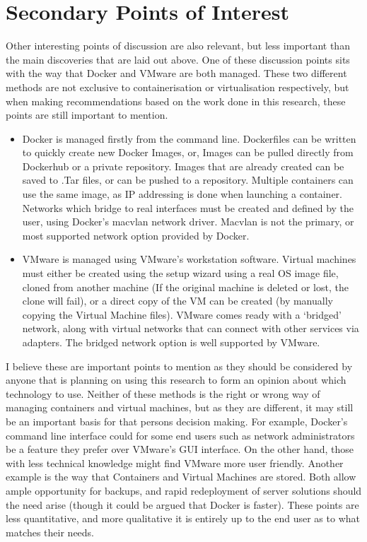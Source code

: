 \section{Secondary Points of Interest}
Other interesting points of discussion are also relevant, but less important than the main discoveries that are laid out above. One of these discussion points sits with the way that Docker and VMware are both managed. These two different methods are not exclusive to containerisation or virtualisation respectively, but when making recommendations based on the work done in this research, these points are still important to mention.
\begin{itemize}
  \item Docker is managed firstly from the command line. Dockerfiles can be written to quickly create new Docker Images, or, Images can be pulled directly from Dockerhub or a private repository. Images that are already created can be saved to .Tar files, or can be pushed to a repository. Multiple containers can use the same image, as IP addressing is done when launching a container. Networks which bridge to real interfaces must be created and defined by the user, using Docker's macvlan network driver. Macvlan is not the primary, or most supported network option provided by Docker.
  \item VMware is managed using VMware's workstation software. Virtual machines must either be created using the setup wizard using a real OS image file, cloned from another machine (If the original machine is deleted or lost, the clone will fail), or a direct copy of the VM can be created (by manually copying the Virtual Machine files). VMware comes ready with a `bridged' network, along with virtual networks that can connect with other services via adapters. The bridged network option is well supported by VMware.
\end{itemize}

I believe these are important points to mention as they should be considered by anyone that is planning on using this research to form an opinion about which technology to use. Neither of these methods is the right or wrong way of managing containers and virtual machines, but as they are different, it may still be an important basis for that persons decision making. For example, Docker's command line interface could for some end users such as network administrators be a feature they prefer over VMware's GUI interface. On the other hand, those with less technical knowledge might find VMware more user friendly. Another example is the way that Containers and Virtual Machines are stored. Both allow ample opportunity for backups, and rapid redeployment of server solutions should the need arise (though it could be argued that Docker is faster). These points are less quantitative, and more qualitative it is entirely up to the end user as to what matches their needs.


